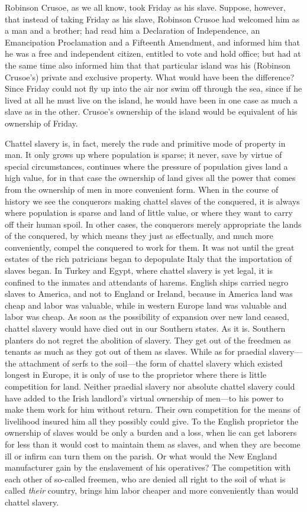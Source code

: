 \documentclass{book}
\begin{document}
Robinson Crusoe, as we all know, took Friday as his slave. Suppose, however, that instead of taking Friday as his slave, Robinson Crusoe had welcomed him as a man and a brother; had read him a Declaration of Independence, an Emancipation Proclamation and a Fifteenth Amendment, and informed him that he was a free and independent citizen, entitled to vote and hold office; but had at the same time also informed him that that particular island was his (Robinson Crusoe’s) private and exclusive property. What would have been the difference? Since Friday could not fly up into the air nor swim off through the sea, since if he lived at all he must live on the island, he would have been in one case as much a slave as in the other. Crusoe’s ownership of the island would be equivalent of his ownership of Friday.

Chattel slavery is, in fact, merely the rude and primitive mode of property in man. It only grows up where population is sparse; it never, save by virtue of special circumstances, continues where the pressure of population gives land a high value, for in that case the ownership of land gives all the power that comes from the ownership of men in more convenient form. When in the course of history we see the conquerors making chattel slaves of the conquered, it is always where population is sparse and land of little value, or where they want to carry off their human spoil. In other cases, the conquerors merely appropriate the lands of the conquered, by which means they just as effectually, and much more conveniently, compel the conquered to work for them. It was not until the great estates of the rich patricians began to depopulate Italy that the importation of slaves began. In Turkey and Egypt, where chattel slavery is yet legal, it is confined to the inmates and attendants of harems. English ships carried negro slaves to America, and not to England or Ireland, because in America land was cheap and labor was valuable, while in western Europe land was valuable and labor was cheap. As soon as the possibility of expansion over new land ceased, chattel slavery would have died out in our Southern states. As it is. Southern planters do not regret the abolition of slavery. They get out of the freedmen as tenants as much as they got out of them as slaves. While as for praedial slavery—the attachment of serfs to the soil—the form of chattel slavery which existed longest in Europe, it is only of use to the proprietor where there is little competition for land. Neither praedial slavery nor absolute chattel slavery could have added to the Irish landlord’s virtual ownership of men—to his power to make them work for him without return. Their own competition for the means of livelihood insured him all they possibly could give. To the English proprietor the ownership of slaves would be only a burden and a loss, when lie can get laborers for less than it would cost to maintain them as slaves, and when they are become ill or infirm can turn them on the parish. Or what would the New England manufacturer gain by the enslavement of his operatives? The competition with each other of so-called freemen, who are denied all right to the soil of what is called \emph{their} country, brings him labor cheaper and more conveniently than would chattel slavery.
\end{document}
